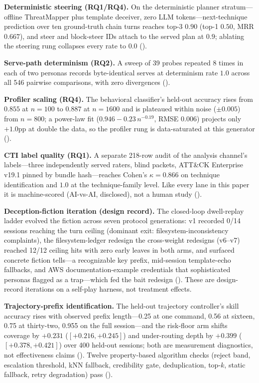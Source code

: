 \textbf{Deterministic steering (RQ1/RQ4).} On the deterministic planner
stratum---offline ThreatMapper plus template deceiver, zero LLM
tokens---next-technique prediction over ten ground-truth chain turns
reaches top-3 $0.90$ (top-1 $0.50$, MRR $0.667$), and steer and
block-steer IDs attach to the served plan at $0.9$; ablating the steering
rung collapses every rate to $0.0$
().

\textbf{Serve-path determinism (RQ2).} A sweep of 39 probes repeated 8
times in each of two personas records byte-identical serves at determinism
rate $1.0$ across all 546 pairwise comparisons, with zero divergences
().

\textbf{Profiler scaling (RQ4).} The behavioral classifier's held-out
accuracy rises from $0.855$ at $n{=}100$ to $0.887$ at $n{=}1600$ and is
plateaued within noise ($\pm 0.005$) from $n{=}800$; a power-law fit
($0.946 - 0.23\,n^{-0.19}$, RMSE $0.006$) projects only $+1.0$pp at double
the data, so the profiler rung is data-saturated at this generator
().

\textbf{CTI label quality (RQ1).} A separate 218-row audit of the
analysis channel's labels---three independently served raters, blind
packets, ATT\&CK Enterprise v19.1 pinned by bundle hash---reaches
Cohen's $\kappa = 0.866$ on technique identification and $1.0$ at the
technique-family level. Like every lane in this paper it is machine-scored
(AI-vs-AI, disclosed), not a human study
().

\textbf{Deception-fiction iteration (design record).} The closed-loop
dwell-replay ladder evolved the fiction across seven protocol generations:
v1 recorded 0/14 sessions reaching the turn ceiling (dominant exit:
filesystem-inconsistency complaints), the filesystem-ledger redesign
the cross-weight redesigns (v6--v7) reached 12/12 ceiling hits with zero early leaves in both arms, and
surfaced concrete fiction tells---a recognizable key prefix, mid-session
template-echo fallbacks, and AWS documentation-example credentials that
sophisticated personas flagged as a trap---which fed the bait redesign
(). These are design-record
iterations on a self-play harness, not treatment effects.

\textbf{Trajectory-prefix identification.} The held-out trajectory
controller's skill accuracy rises with observed prefix length---0.25 at
one command, 0.56 at sixteen, 0.75 at thirty-two, 0.955 on the full
session---and the risk-floor arm shifts coverage by $+0.231$
($[+0.216,+0.245]$) and under-routing depth by $+0.399$
($[+0.378,+0.421]$) over 400 held-out sessions; both are measurement
diagnostics, not effectiveness claims
().
Twelve property-based algorithm checks (reject band, escalation
threshold, kNN fallback, credibility gate, deduplication, top-$k$, static
fallback, retry degradation) pass
().

